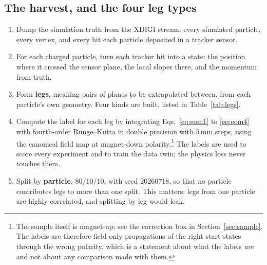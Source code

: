 \documentclass[11pt,a4paper]{article}
\newcommand{\mm}{\ensuremath{\,\mathrm{mm}}}
\begin{document}
\subsection{The harvest, and the four leg types}

\begin{enumerate}
  \item Dump the simulation truth from the XDIGI stream: every simulated
  particle, every vertex, and every hit each particle deposited in a tracker
  sensor.
  \item For each charged particle, turn each tracker hit into a state: the
  position where it crossed the sensor plane, the local slopes there, and the
  momentum from truth.
  \item Form \textbf{legs}, meaning pairs of planes to be extrapolated between,
  from each particle's own geometry. Four kinds are built, listed in
  Table~\ref{tab:legs}.
  \item Compute the label for each leg by integrating
  Eqs.~\eqref{eq:eom1} to \eqref{eq:eom4} with fourth-order Runge--Kutta in
  double precision with $5\mm$ steps, using the canonical field map at
  magnet-down polarity.\footnote{The sample itself is magnet-up; see the
  correction box in Section~\ref{sec:sample}. The labels are therefore
  field-only propagations of the right start states through the wrong polarity,
  which is a statement about what the labels \emph{are} and not about any
  comparison made with them.} The labels are used to score every experiment and
  to train the data twin; the physics loss never touches them.
  \item Split by \textbf{particle}, $80/10/10$, with seed $20260718$, so that no
  particle contributes legs to more than one split. This matters: legs from one
  particle are highly correlated, and splitting by leg would leak.
\end{enumerate}
\end{document}
